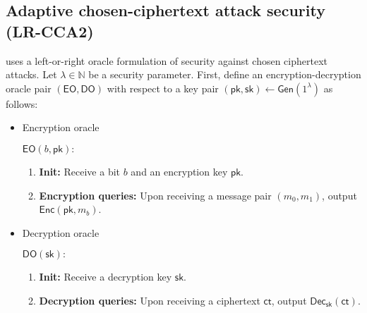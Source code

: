 \documentclass[11pt,letterpaper]{article}
\newcommand{\authnote}[2]{[{\color{red}\textbf{#1:}}~{\color{blue} #2}]}
\newcommand{\authnote}[2]{}
\newcommand{\megan}[1]{\authnote{Megan}{#1}}
\theoremstyle{plain} %
\theoremstyle{definition} %
\theoremstyle{remark} %
\newcommand{\eqdef}{\ {:=} \ }
\newcommand{\SecParam}{\lambda}
\newcommand{\Gen}{\mathsf{Gen}}
\newcommand{\Enc}{\mathsf{Enc}}
\newcommand{\OblivEnc}{\mathsf{OblivEnc}}
\newcommand{\Dec}{\mathsf{Dec}}
\newcommand{\EncKey}{\mathsf{pk}}
\newcommand{\DecKey}{\mathsf{sk}}
\newcommand{\ChallengerBit}{b}
\newcommand{\EncOracle}{\mathsf{EO}}
\newcommand{\DecOracle}{\mathsf{DO}}
\newcommand{\Msg}{m}
\newcommand{\Ct}{\mathsf{ct}}
\newcommand{\Rand}{r}
\newcommand{\Distribution}{\mathcal{D}}
\newcommand{\RandSpace}{\mathcal{R}}
\newcommand{\Naturals}{\mathbb{N}}
\begin{document}
%
%

\subsection{Adaptive chosen-ciphertext attack security (LR-CCA2)}
\label{sec:lr-cca2}
\cite{CanettiF01} uses a left-or-right oracle formulation of security against chosen ciphertext attacks. Let $\SecParam\in\Naturals$ be a security parameter. First, define an encryption-decryption oracle pair $(\EncOracle, \DecOracle)$ with respect to a key pair $(\EncKey,\DecKey) \gets \Gen(1^\SecParam)$ as follows:
\begin{itemize}
	\item Encryption oracle

	\begin{minipage}{0.9\textwidth}
	$\EncOracle(\ChallengerBit,\EncKey):$
	\begin{enumerate}[nolistsep]
		\item \textbf{Init:} Receive a bit $\ChallengerBit$ and an encryption key $\EncKey$.
		\item \textbf{Encryption queries:} Upon receiving a message pair $(\Msg_0, \Msg_1)$, output $\Enc(\EncKey,\Msg_{\ChallengerBit})$.
	\end{enumerate}
	\end{minipage}

	\item Decryption oracle

	\begin{minipage}{0.9\textwidth}
	$\DecOracle(\DecKey):$
	\begin{enumerate}[nolistsep]
		\item \textbf{Init:} Receive a decryption key $\DecKey$.
		\item \textbf{Decryption queries:} Upon receiving a ciphertext $\Ct$, output $\Dec_{\DecKey}(\Ct)$.
	\end{enumerate}
	\end{minipage}
\end{itemize}
\end{document}
